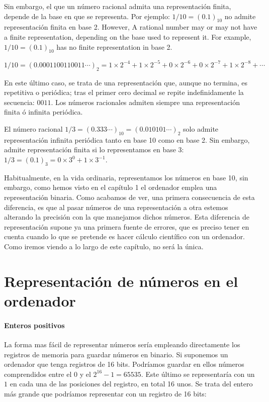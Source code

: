 \begin{paracol}{2}
Sin embargo, el que un número racional admita una representación finita, depende de la base en que se representa. Por ejemplo: $1/10=(0.1)_{10}$ no admite representación finita en base 2.
\switchcolumn
However, A rational number may or may not have a finite representation, depending on the base used to represent it. For example, $1/10=(0.1)_{10}$ has no finite representation in base 2. 
\end{paracol}
\begin{equation*}
1/10=(0.0001100110011\cdots)_2 =1\times2^{-4}+1\times2^{-5}+0\times2^{-6}+0\times2^{-7}+1\times2^{-8}+\cdots 
\end{equation*}
\begin{paracol}{2}
En este último caso, se trata de una representación que, aunque no termina, es repetitiva o periódica; tras el primer cero decimal se repite indefinidamente la secuencia: $0011$. Los números racionales admiten siempre una representación finita ó infinita periódica. 

El número racional $1/3=(0.333\cdots)_{10}=(0.010101\cdots)_2$ solo admite representación infinita periódica tanto en base 10 como en base 2. Sin embargo, admite representación finita si lo representamos en base 3: $1/3=(0.1)_3=0\times3^0+1\times3^{-1}$.

Habitualmente, en la vida ordinaria, representamos los números en base 10, sin embargo, como hemos visto en el capítulo 1 el ordenador emplea una representación binaria. Como acabamos de ver, una primera consecuencia de esta diferencia, es que al pasar números de una representación a otra estemos alterando la precisión con la que manejamos dichos números. Esta diferencia de representación supone ya una primera fuente de errores, que es preciso tener en cuenta cuando lo que se pretende es hacer cálculo científico con un ordenador. Como iremos viendo a lo largo de este capítulo, no será la única.

\section{Representación de nú\-meros en el ordenador}
\paragraph{Enteros positivos} La forma mas fácil de representar números sería empleando directamente los registros de memoria para guardar números en binario.  Si suponemos un ordenador que tenga registros de 16 bits. Podríamos guardar en ellos números comprendidos entre el $0$ y el $2^{16}-1=65535$. Este último se representaría con un $1$ en cada una de las posiciones del registro, en total 16 unos. Se trata del entero más grande que podríamos representar con un registro de 16 bits:


\end{paracol}
